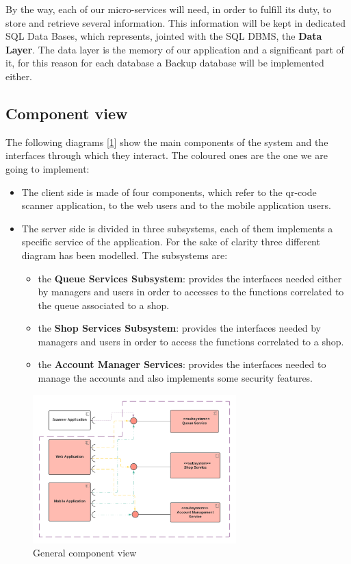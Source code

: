 By the way, each of our micro-services will need, in order to fulfill its duty, to store and retrieve several information. This information will be kept in dedicated SQL Data Bases, which represents, jointed with the SQL DBMS, the \textbf{Data Layer}. The data layer is the memory of our application and a significant part of it, for this reason for each database a Backup database will be implemented either.

\subsection{Component view}
\label{subsect:componentview}

The following diagrams [\ref{fig:ComponentViewHighLevel}] show the main components of the system and the interfaces through which they interact. The coloured ones are the one we are going to implement:

\begin{itemize}[topsep=0pt]
    \item The client side is made of four components, which refer to the qr-code scanner application, to the web users and to the mobile application users.
    \item The server side is divided in three subsystems, each of them implements a specific service of the application. For the sake of clarity three different diagram has been modelled. The subsystems are:
    \begin{itemize}[topsep=0pt]
        \item the \textbf{Queue Services Subsystem}: provides the interfaces needed either by managers and users in order to accesses to the functions correlated to the queue associated to a shop. 
        \item the \textbf{Shop Services Subsystem}: provides the interfaces needed by managers and users in order to access the functions correlated to a shop.
        \item the \textbf{Account Manager Services}: provides the interfaces needed to manage the accounts and also implements some security features.
    \end{itemize}
\end{itemize}

\begin{figure}[h!]
    \centering
    \includegraphics[width=0.7\textwidth]{Images/ComponentViewHighLevel(1).png}
    \caption{\label{fig:ComponentViewHighLevel}{General component view}}
\end{figure}

